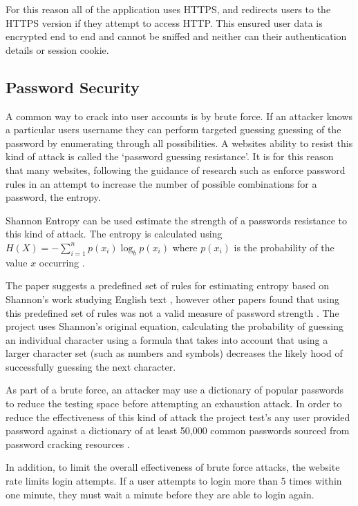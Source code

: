 For this reason all of the application uses HTTPS, and redirects users to the HTTPS version if they attempt to access HTTP. This ensured user data is encrypted end to end and cannot be sniffed and neither can their authentication details or session cookie.

\subsection{Password Security}

A common way to crack into user accounts is by brute force. If an attacker knows a particular users username they can perform targeted guessing guessing of the password by enumerating through all possibilities. A websites ability to resist this kind of attack is called the `password guessing resistance'. It is for this reason that many websites, following the guidance of research such as \cite{needed} enforce password rules in an attempt to increase the number of possible combinations for a password, the entropy.

Shannon Entropy can be used estimate the strength of a passwords resistance to this kind of attack. The entropy is calculated using $H(X)= -\sum_{i=1}^n{p(x_i)\log_b p(x_i)}$ where $p(x_i)$ is the probability of the value $x$ occurring \cite{burr2013electronic}.

The paper suggests a predefined set of rules for estimating entropy based on Shannon's work studying English text \cite{burr2013electronic}, however other papers found that using this predefined set of rules was not a valid measure of password strength \cite{weir2010shannon}.
% 
The project uses Shannon's original equation, calculating the probability of guessing an individual character using a formula that takes into account that using a larger character set (such as numbers and symbols) decreases the likely hood of successfully guessing the next character.

As part of a brute force, an attacker may use a dictionary of popular passwords to reduce the testing space before attempting an exhaustion attack. In order to reduce the effectiveness of this kind of attack the project test's any user provided password against a dictionary of at least 50,000 common passwords sourced from password cracking resources \cite{burr2013electronic}.

In addition, to limit the overall effectiveness of brute force attacks, the website rate limits login attempts. If a user attempts to login more than 5 times within one minute, they must wait a minute before they are able to login again.

